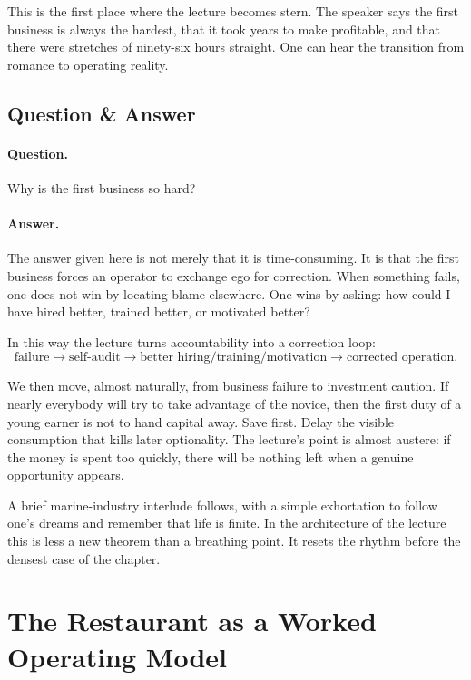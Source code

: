 This is the first place where the lecture becomes stern. The speaker says the first business is always the hardest, that it took years to make profitable, and that there were stretches of ninety-six hours straight. One can hear the transition from romance to operating reality.

\subsection{Question \& Answer}

\paragraph{Question.} Why is the first business so hard?

\paragraph{Answer.} The answer given here is not merely that it is time-consuming. It is that the first business forces an operator to exchange ego for correction. When something fails, one does not win by locating blame elsewhere. One wins by asking: how could I have hired better, trained better, or motivated better?

In this way the lecture turns accountability into a correction loop:
\begin{equation}
\text{failure}
\longrightarrow
\text{self-audit}
\longrightarrow
\text{better hiring/training/motivation}
\longrightarrow
\text{corrected operation}.
\end{equation}

We then move, almost naturally, from business failure to investment caution. If nearly everybody will try to take advantage of the novice, then the first duty of a young earner is not to hand capital away. Save first. Delay the visible consumption that kills later optionality. The lecture's point is almost austere: if the money is spent too quickly, there will be nothing left when a genuine opportunity appears.

A brief marine-industry interlude follows, with a simple exhortation to follow one's dreams and remember that life is finite. In the architecture of the lecture this is less a new theorem than a breathing point. It resets the rhythm before the densest case of the chapter.

\section{The Restaurant as a Worked Operating Model}

